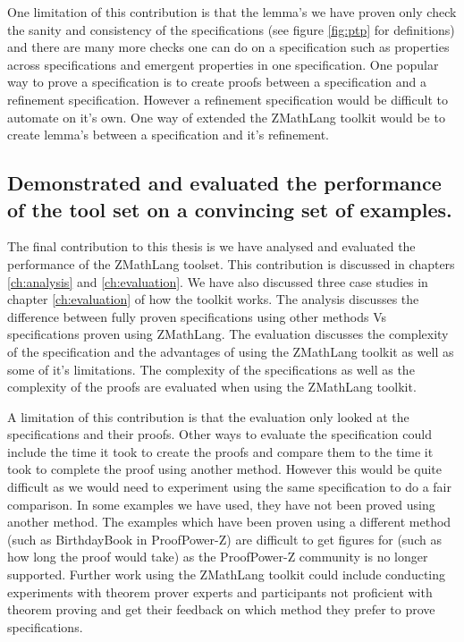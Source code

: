 One limitation of this contribution is that the lemma's we have proven
only check the sanity and consistency of the specifications (see figure
\ref{fig:ptp} for definitions) and there are many more checks one can do on a
specification such as properties across specifications and emergent properties
in one specification. One popular way to prove a specification is to create proofs
between a specification and a refinement specification. However a refinement
specification would be difficult to automate on it's own. One way of extended
the ZMathLang toolkit would be to create lemma's between a specification and
it's refinement.

\subsection{Demonstrated and evaluated the performance of the tool set on a convincing
 set of examples.}

 The final contribution to this thesis is we have analysed and evaluated the
 performance of the ZMathLang toolset. This contribution is discussed in
 chapters \ref{ch:analysis} and \ref{ch:evaluation}. We have also discussed
 three case studies in chapter \ref{ch:evaluation} of how the toolkit works. The
 analysis discusses the difference between fully proven specifications using
 other methods Vs specifications proven using ZMathLang. The evaluation discusses
 the complexity of the specification and the advantages of using the ZMathLang
 toolkit as well as some of it's limitations. The complexity of the
 specifications as well as the complexity of the proofs are evaluated when using
the ZMathLang toolkit.

A limitation of this contribution is that the evaluation only looked at the
specifications and their proofs. Other ways to evaluate the specification could
include the time it took to create the proofs and compare them to the time it
took to complete the proof using another method. However this would be quite
difficult as we would need to experiment using the same specification to do a
fair comparison. In some examples we have used, they have not been proved using
another method. The examples which have been proven using a different method
(such as BirthdayBook in ProofPower-Z) are difficult to get figures for (such as
how long the proof would take) as the ProofPower-Z community is no longer
supported.
Further work using the ZMathLang toolkit could include conducting experiments
with theorem prover experts and participants not proficient with theorem proving
and get their feedback on which method they prefer to prove specifications.


